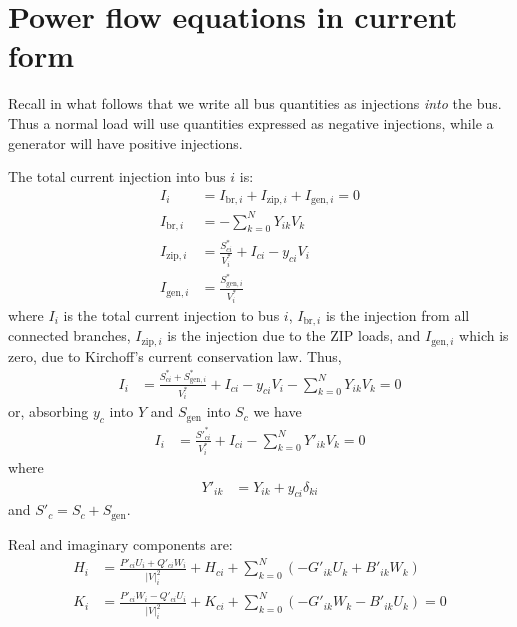 \documentclass[11pt]{article}
\newcommand{\Vr}{\ensuremath{U}}
\newcommand{\Vi}{\ensuremath{W}}
\newcommand{\Ir}{\ensuremath{H}}
\newcommand{\Ii}{\ensuremath{K}}
\begin{document}
\section{Power flow equations in current form}
Recall in what follows that we write all bus quantities as injections \emph{into} the bus. Thus a normal load will use quantities expressed as negative injections, while a generator will have positive injections.

The total current injection into bus $i$ is:
\begin{align}
I_i &= I_{\text{br}, i} + I_{\text{zip},i} + I_{\text{gen}, i} = 0\\
I_{\text{br},i} &= -\sum_{k=0}^NY_{ik}V_k \\
I_{\text{zip},i} &= \frac{S^*_{ci}}{V^*_i} + I_{ci} - y_{ci}V_i \\
I_{\text{gen},i} &= \frac{S^*_{\text{gen},i}}{V^*_i}
\end{align}
where $I_i$ is the total current injection to bus $i$, $I_{\text{br},i}$ is the injection from all connected branches, $I_{\text{zip},i}$ is the injection due to the ZIP loads, and $I_{\text{gen},i}$
which is zero, due to Kirchoff's current conservation law. Thus,
\begin{align}
I_i &= \frac{S^*_{ci} + S^*_{\text{gen},i}}{V^*_i} + I_{ci} - y_{ci}V_i - \sum_{k=0}^NY_{ik}V_k = 0
\end{align}
or, absorbing $y_c$ into $Y$ and $S_{\text{gen}}$ into $S_c$ we have
\begin{align}
I_i &= \frac{S'^*_{ci}}{V^*_i} + I_{ci} - \sum_{k=0}^NY'_{ik}V_k = 0
\end{align}
where
\begin{align}
	Y'_{ik} &= Y_{ik} + y_{ci}\delta_{ki}
\end{align}
and $S'_c = S_c + S_{\text{gen}}$.

Real and imaginary components are:
\begin{align}
\Ir_i &= \frac{P'_{ci}\Vr_i + Q'_{ci}\Vi_i}{|V|^2_i} + \Ir_{ci} + \sum_{k=0}^N\left(-G'_{ik}\Vr_k + B'_{ik}\Vi_k\right) \\
\Ii_i &= \frac{P'_{ci}\Vi_i - Q'_{ci}\Vr_i}{|V|^2_i} + \Ii_{ci} + \sum_{k=0}^N\left(-G'_{ik}\Vi_k - B'_{ik}\Vr_k\right) = 0
\end{align}
\end{document}

